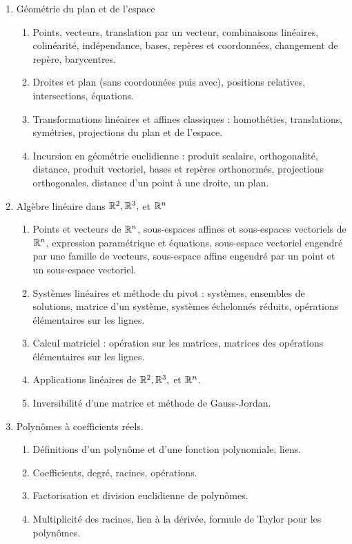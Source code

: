 \begin{enumerate}
	\item 
	Géométrie du plan et de l'espace
	\begin{enumerate}
		\item
		Points, vecteurs, translation par un vecteur, combinaisons linéaires, colinéarité, indépendance, bases, repères et coordonnées, changement de repère, barycentres.
		\item
		Droites et plan (sans coordonnées puis avec), positions relatives, intersections, équations.
		\item
		Transformations linéaires et affines classiques : homothéties, translations, symétries, projections du plan et de l'espace.
		\item
		Incursion en géométrie euclidienne : produit scalaire, orthogonalité, distance, produit vectoriel, bases et repères orthonormés, projections orthogonales, distance d'un point à une droite, un plan.
	\end{enumerate}
	\item 
	Algèbre linéaire dans $\mathbb{R}^2, \mathbb{R}^3, $ et $\mathbb{R}^n$ 
	\begin{enumerate}
		\item
		Points et vecteurs de $\mathbb{R}^n$, sous-espaces affines et sous-espaces vectoriels de $\mathbb{R}^n$, expression paramétrique et équations, sous-espace vectoriel engendré par une famille de vecteurs, sous-espace affine engendré par un point et un sous-espace vectoriel.
		\item
		Systèmes linéaires et méthode du pivot : systèmes, ensembles de solutions, matrice d'un système, systèmes échelonnés réduits, opérations élémentaires sur les lignes.
		\item
		Calcul matriciel : opération sur les matrices, matrices des opérations élémentaires sur les lignes.
		\item
		Applications linéaires de $\mathbb{R}^2, \mathbb{R}^3,$ et $\mathbb{R}^n$.
		\item
		Inversibilité d'une matrice et méthode de Gauss-Jordan.
	\end{enumerate}
	\item 
	Polynômes à coefficients réels.
	\begin{enumerate}
		\item
		Définitions d'un polynôme et d'une fonction polynomiale, liens.
		\item
		Coefficients, degré, racines, opérations.
		\item
		Factorisation et division euclidienne de polynômes.
		\item
		Multiplicité des racines, lien à la dérivée, formule de Taylor pour les polynômes.
	\end{enumerate}
\end{enumerate}

